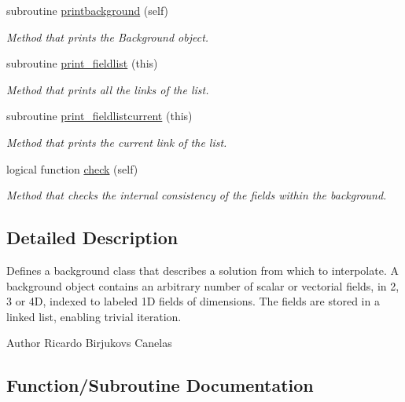 \begin{DoxyCompactItemize}
subroutine \mbox{\hyperlink{namespacebackground__mod_a8a8f225cffcddb742f22a402155b703f}{printbackground}} (self)
\begin{DoxyCompactList}\small\item\em Method that prints the Background object. \end{DoxyCompactList}\item 
subroutine \mbox{\hyperlink{namespacebackground__mod_acdcc52b4fb298bc145a121f9e8a4b929}{print\+\_\+fieldlist}} (this)
\begin{DoxyCompactList}\small\item\em Method that prints all the links of the list. \end{DoxyCompactList}\item 
subroutine \mbox{\hyperlink{namespacebackground__mod_a2bd18f3830c0667741efd086d36753db}{print\+\_\+fieldlistcurrent}} (this)
\begin{DoxyCompactList}\small\item\em Method that prints the current link of the list. \end{DoxyCompactList}\item 
logical function \mbox{\hyperlink{namespacebackground__mod_af2f517e4aa946491744e012153045bd4}{check}} (self)
\begin{DoxyCompactList}\small\item\em Method that checks the internal consistency of the fields within the background. \end{DoxyCompactList}\end{DoxyCompactItemize}


\subsection{Detailed Description}
Defines a background class that describes a solution from which to interpolate. A background object contains an arbitrary number of scalar or vectorial fields, in 2, 3 or 4D, indexed to labeled 1D fields of dimensions. The fields are stored in a linked list, enabling trivial iteration. 

\begin{DoxyAuthor}{Author}
Ricardo Birjukovs Canelas 
\end{DoxyAuthor}


\subsection{Function/\+Subroutine Documentation}
\mbox{\label{namespacebackground__mod_aa6ddc308698724f00ce1177ded5afc4c}} 
